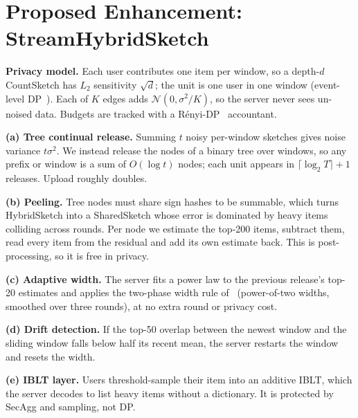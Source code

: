 \documentclass[conference]{IEEEtran}
\begin{document}
\section{Proposed Enhancement: StreamHybridSketch}
\textbf{Privacy model.} Each user contributes one item per window, so a depth-$d$ CountSketch has $L_2$ sensitivity
$\sqrt d$; the unit is one user in one window (event-level DP~\cite{dwork2010}). Each of $K$ edges adds
$\mathcal N(0,\sigma^2/K)$, so the server never sees un-noised data. Budgets are tracked with a R\'enyi-DP~\cite{mironov2017} accountant.

\textbf{(a) Tree continual release.} Summing $t$ noisy per-window sketches gives noise variance $t\sigma^2$. We instead
release the nodes of a binary tree over windows, so any prefix or window is a sum of $O(\log t)$ nodes; each unit appears
in $\lceil\log_2 T\rceil{+}1$ releases. Upload roughly doubles.

\textbf{(b) Peeling.} Tree nodes must share sign hashes to be summable, which turns HybridSketch into a SharedSketch whose
error is dominated by heavy items colliding across rounds. Per node we estimate the top-200 items, subtract them, read every
item from the residual and add its own estimate back. This is post-processing, so it is free in privacy.

\textbf{(c) Adaptive width.} The server fits a power law to the previous release's top-20 estimates and applies the
two-phase width rule of~\cite{wu2023} (power-of-two widths, smoothed over three rounds), at no extra round or privacy cost.

\textbf{(d) Drift detection.} If the top-50 overlap between the newest window and the sliding window falls below half its
recent mean, the server restarts the window and resets the width.

\textbf{(e) IBLT layer.} Users threshold-sample their item into an additive IBLT, which the server decodes to list heavy
items without a dictionary. It is protected by SecAgg and sampling, not DP.
\end{document}
